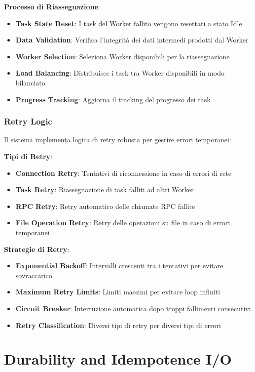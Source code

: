 \documentclass[12pt,a4paper]{article}
\begin{document}
\textbf{Processo di Riassegnazione}:
\begin{itemize}
\item \textbf{Task State Reset}: I task del Worker fallito vengono resettati a stato Idle
\item \textbf{Data Validation}: Verifica l'integrità dei dati intermedi prodotti dal Worker
\item \textbf{Worker Selection}: Seleziona Worker disponibili per la riassegnazione
\item \textbf{Load Balancing}: Distribuisce i task tra Worker disponibili in modo bilanciato
\item \textbf{Progress Tracking}: Aggiorna il tracking del progresso dei task
\end{itemize}

\subsubsection{Retry Logic}

Il sistema implementa logica di retry robusta per gestire errori temporanei:

\textbf{Tipi di Retry}:
\begin{itemize}
\item \textbf{Connection Retry}: Tentativi di riconnessione in caso di errori di rete
\item \textbf{Task Retry}: Riassegnazione di task falliti ad altri Worker
\item \textbf{RPC Retry}: Retry automatico delle chiamate RPC fallite
\item \textbf{File Operation Retry}: Retry delle operazioni su file in caso di errori temporanei
\end{itemize}

\textbf{Strategie di Retry}:
\begin{itemize}
\item \textbf{Exponential Backoff}: Intervalli crescenti tra i tentativi per evitare sovraccarico
\item \textbf{Maximum Retry Limits}: Limiti massimi per evitare loop infiniti
\item \textbf{Circuit Breaker}: Interruzione automatica dopo troppi fallimenti consecutivi
\item \textbf{Retry Classification}: Diversi tipi di retry per diversi tipi di errori
\end{itemize}

\section{Durability and Idempotence I/O}
\end{document}
